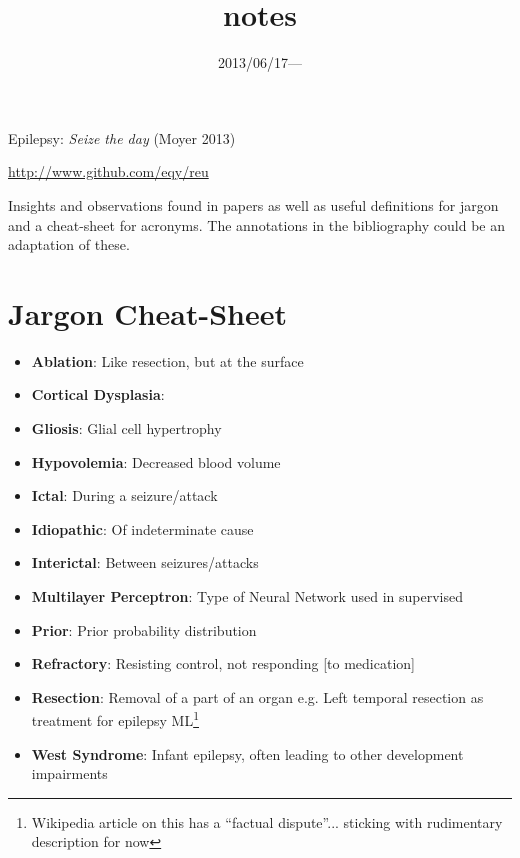 \documentclass{article}
\title{\vspace{-3ex}notes}
\date{2013/06/17---}
\begin{document}
    \maketitle
    \begin{center}Epilepsy: \emph{Seize the day} (Moyer 2013)\end{center}

    \url{http://www.github.com/eqy/reu}
    
    Insights and observations found in papers as well as useful definitions for
    jargon and a cheat-sheet for acronyms. The annotations in the bibliography 
could be an adaptation of these.

    \tableofcontents
    \section{Jargon Cheat-Sheet}
        \begin{itemize}
            \item \textbf{Ablation}: Like resection, but at the surface
            \item \textbf{Cortical Dysplasia}: \item \textbf{Gliosis}: Glial 
cell hypertrophy
            \item \textbf{Hypovolemia}: Decreased blood volume
            \item \textbf{Ictal}: During a seizure/attack
            \item \textbf{Idiopathic}: Of indeterminate cause
            \item \textbf{Interictal}: Between seizures/attacks
            \item \textbf{Multilayer Perceptron}: Type of Neural Network used in 
supervised
            \item \textbf{Prior}: Prior probability distribution
            \item \textbf{Refractory}: Resisting control, not responding [to 
medication] \item \textbf{Resection}: Removal of a part of an organ e.g. Left 
temporal
            resection as treatment for epilepsy
            ML\footnote{Wikipedia article on this has a ``factual dispute''...  
sticking with
            rudimentary description for now}
            \item \textbf{West Syndrome}: Infant epilepsy, often leading to other 
development
            impairments
        \end{itemize}
\end{document}
